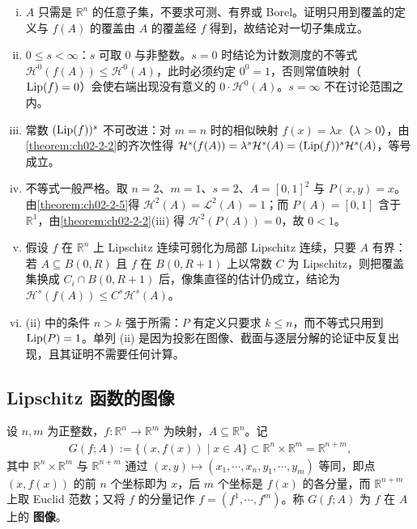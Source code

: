 \documentclass[../../main.tex]{subfiles}%
\begin{document}
\begin{remark}\label{remark:ch02-thm-2-8-条件}
\begin{enumerate}[(i)]
\item $A$ 只需是 $\mathbb{R}^n$ 的任意子集，不要求可测、有界或 Borel。证明只用到覆盖的定义与 $f(A)$ 的覆盖由 $A$ 的覆盖经 $f$ 得到，故结论对一切子集成立。
\item $0\leqslant s<\infty$：$s$ 可取 $0$ 与非整数。$s=0$ 时结论为计数测度的不等式 $\mathcal{H}^0(f(A))\leqslant\mathcal{H}^0(A)$，此时必须约定 $0^0=1$，否则常值映射（$\operatorname{Lip}(f)=0$）会使右端出现没有意义的 $0\cdot\mathcal{H}^0(A)$。$s=\infty$ 不在讨论范围之内。
\item 常数 $(\operatorname{Lip}(f))^s$ 不可改进：对 $m=n$ 时的相似映射 $f(x)=\lambda x$（$\lambda>0$），由\cref{theorem:ch02-2-2}的齐次性得 $\mathcal{H}^s(f(A))=\lambda^s\mathcal{H}^s(A)=(\operatorname{Lip}(f))^s\mathcal{H}^s(A)$，等号成立。%
\item 不等式一般严格。取 $n=2$、$m=1$、$s=2$、$A=[0,1]^2$ 与 $P(x,y)=x$。由\cref{theorem:ch02-2-5}得 $\mathcal{H}^2(A)=\mathcal{L}^2(A)=1$；而 $P(A)=[0,1]$ 含于 $\mathbb{R}^1$，由\cref{theorem:ch02-2-2}(iii) 得 $\mathcal{H}^2(P(A))=0$，故 $0<1$。%
\item 假设 $f$ 在 $\mathbb{R}^n$ 上 Lipschitz 连续可弱化为局部 Lipschitz 连续，只要 $A$ 有界：若 $A\subseteq B(0,R)$ 且 $f$ 在 $B(0,R+1)$ 上以常数 $C$ 为 Lipschitz，则把覆盖集换成 $C_i\cap B(0,R+1)$ 后，像集直径的估计仍成立，结论为 $\mathcal{H}^s(f(A))\leqslant C^s\mathcal{H}^s(A)$。
\item (ii) 中的条件 $n>k$ 强于所需：$P$ 有定义只要求 $k\leqslant n$，而不等式只用到 $\operatorname{Lip}(P)=1$。单列 (ii) 是因为投影在图像、截面与逐层分解的论证中反复出现，且其证明不需要任何计算。
\end{enumerate}
\end{remark}

\subsection{Lipschitz 函数的图像}\label{subsection:ch02-04-2}

\begin{definition}[图像]\label{definition:ch02-2-5}
设 $n,m$ 为正整数，$f:\mathbb{R}^n\to\mathbb{R}^m$ 为映射，$A\subseteq\mathbb{R}^n$。记
\begin{align*}
G(f;A):=\{(x,f(x))\mid x\in A\}\subset\mathbb{R}^n\times\mathbb{R}^m=\mathbb{R}^{n+m},
\end{align*}
其中 $\mathbb{R}^n\times\mathbb{R}^m$ 与 $\mathbb{R}^{n+m}$ 通过 $(x,y)\mapsto(x_1,\cdots,x_n,y_1,\cdots,y_m)$ 等同，即点 $(x,f(x))$ 的前 $n$ 个坐标即为 $x$，后 $m$ 个坐标是 $f(x)$ 的各分量，而 $\mathbb{R}^{n+m}$ 上取 Euclid 范数；又将 $f$ 的分量记作 $f=(f^1,\cdots,f^m)$。称 $G(f;A)$ 为 $f$ 在 $A$ 上的 \textbf{图像}。
\end{definition}
\end{document}
